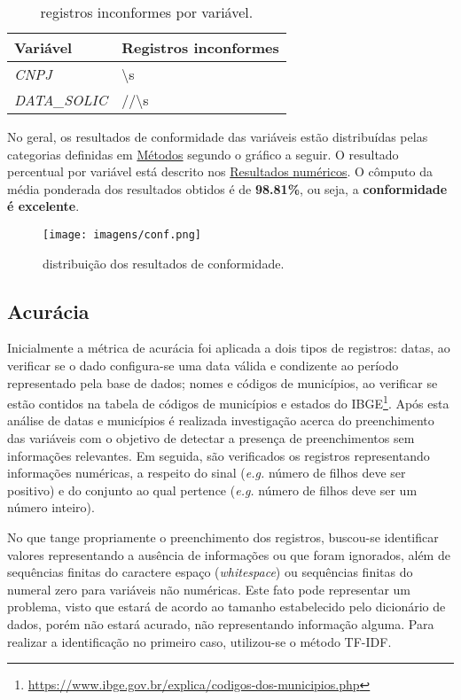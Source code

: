\documentclass[
  12,
  table]{proadi}
\begin{document}
\begingroup\fontsize{10}{12}\selectfont

\begin{longtable}[t]{>{}l>{\raggedright\arraybackslash}p{10cm}}
\caption{\label{tab:unnamed-chunk-13}registros inconformes por variável.}\\
\toprule
Variável & Registros inconformes\\
\midrule
\em{CNPJ} & \textbackslash{}s\\
\em{DATA\_SOLIC} & //\textbackslash{}s\\
\bottomrule
\end{longtable}
\endgroup{}

No geral, os resultados de conformidade das variáveis estão distribuídas
pelas categorias definidas em \protect\hyperlink{muxe9todos}{Métodos}
segundo o gráfico a seguir. O resultado percentual por variável está
descrito nos \protect\hyperlink{resultados-numuxe9ricos}{Resultados
numéricos}. O cômputo da média ponderada dos resultados obtidos é de
\textbf{98.81\%}, ou seja, a \textbf{conformidade é excelente}.

\begin{figure}
\centering
\texttt{[image: imagens/conf.png]}
\caption{distribuição dos resultados de conformidade.}
\end{figure}

\hypertarget{acuruxe1cia}{%
\subsection{Acurácia}\label{acuruxe1cia}}

Inicialmente a métrica de acurácia foi aplicada a dois tipos de
registros: datas, ao verificar se o dado configura-se uma data válida e
condizente ao período representado pela base de dados; nomes e códigos
de municípios, ao verificar se estão contidos na tabela de códigos de
municípios e estados do IBGE\footnote{\url{https://www.ibge.gov.br/explica/codigos-dos-municipios.php}}.
Após esta análise de datas e municípios é realizada investigação acerca
do preenchimento das variáveis com o objetivo de detectar a presença de
preenchimentos sem informações relevantes. Em seguida, são verificados
os registros representando informações numéricas, a respeito do sinal
(\emph{e.g.} número de filhos deve ser positivo) e do conjunto ao qual
pertence (\emph{e.g.} número de filhos deve ser um número inteiro).

No que tange propriamente o preenchimento dos registros, buscou-se
identificar valores representando a ausência de informações ou que foram
ignorados, além de sequências finitas do caractere espaço
(\emph{whitespace}) ou sequências finitas do numeral zero para variáveis
não numéricas. Este fato pode representar um problema, visto que estará
de acordo ao tamanho estabelecido pelo dicionário de dados, porém não
estará acurado, não representando informação alguma. Para realizar a
identificação no primeiro caso, utilizou-se o método TF-IDF.
\end{document}
